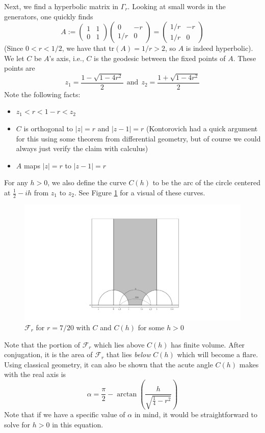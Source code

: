 \documentclass[]{article}
\begin{document}
Next, we find a hyperbolic matrix in $\Gamma_r$.
Looking at small words in the generators, one quickly finds
$$
A :=
\begin{pmatrix}
	1 & 1 \\
	0 & 1
\end{pmatrix}
\begin{pmatrix}
	0 & -r \\
	1/r & 0
\end{pmatrix} =
\begin{pmatrix}
	1/r & -r \\
	1/r & 0
\end{pmatrix}
$$
(Since $0 < r < 1/2$, we have that tr$(A) = 1/r > 2$, so $A$ is indeed hyperbolic).
We let $C$ be $A$'s axis, i.e., $C$ is the geodesic between the fixed points of $A$.
These points are
$$
z_1 = \frac{1 - \sqrt{1 - 4r^2}}{2} ~~ \text{and} ~~ z_2 = \frac{1 + \sqrt{1 - 4r^2}}{2}
$$
Note the following facts:
\begin{itemize}
	\item $z_1 < r < 1 - r < z_2$
	\item $C$ is orthogonal to $|z| = r$ and $|z - 1| = r$ (Kontorovich had a quick argument for this using some theorem from differential geometry, but of course we could always just verify the claim with calculus)
	\item $A$ maps $|z| = r$ to $|z - 1| = r$
\end{itemize}
For any $h > 0$, we also define the curve $C(h)$ to be the arc of the circle centered at $\frac{1}{2} - ih$ from $z_1$ to $z_2$.
See Figure \ref{FrWithCs} for a visual of these curves.
\begin{figure}[h]
	\centering
	\includegraphics[trim=400 60 380 80, clip, width=0.6\linewidth]{F_r_with_Cs.pdf}
	\caption{$\mathcal{F}_r$ for $r = 7/20$ with $C$ and $C(h)$ for some $h > 0$}
	\label{FrWithCs}
\end{figure}
Note that the portion of $\mathcal{F}_r$ which lies above $C(h)$ has finite volume.
After conjugation, it is the area of $\mathcal{F}_r$ that lies \textit{below} $C(h)$ which will become a flare.
Using classical geometry, it can also be shown that the acute angle $C(h)$ makes with the real axis is
$$
\alpha = \frac{\pi}{2} - \arctan\left( \frac{h}{\sqrt{\frac{1}{4} - r^2}} \right)
$$
Note that if we have a specific value of $\alpha$ in mind, it would be straightforward to solve for $h > 0$ in this equation.
\end{document}
